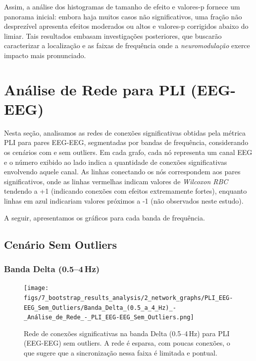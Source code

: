 Assim, a análise dos histogramas de tamanho de efeito e valores-p fornece um panorama inicial: embora haja muitos casos não significativos, uma fração não desprezível apresenta efeitos moderados ou altos e valores-p corrigidos abaixo do limiar. Tais resultados embasam investigações posteriores, que buscarão caracterizar a localização e as faixas de frequência onde a \emph{neuromodulação} exerce impacto mais pronunciado.


\section{Análise de Rede para PLI (EEG-EEG)}
\label{sec:rede_pli_eeg}

Nesta seção, analisamos as redes de conexões significativas obtidas pela métrica PLI para pares EEG-EEG, segmentadas por bandas de frequência, considerando os cenários com e sem outliers. Em cada grafo, cada nó representa um canal EEG e o número exibido ao lado indica a quantidade de conexões significativas envolvendo aquele canal. As linhas conectando os nós correspondem aos pares significativos, onde as linhas vermelhas indicam valores de \emph{Wilcoxon RBC} tendendo a +1 (indicando conexões com efeitos extremamente fortes), enquanto linhas em azul indicariam valores próximos a -1 (não observados neste estudo).

A seguir, apresentamos os gráficos para cada banda de frequência.

\subsection{Cenário Sem Outliers}
\subsubsection{\texorpdfstring{Banda Delta (0.5--4\,Hz)}{Banda Delta (0.5-4 Hz)}}
\begin{figure}[htb]
  \centering
  \texttt{[image: figs/7\_bootstrap\_results\_analysis/2\_network\_graphs/PLI\_EEG-EEG\_Sem\_Outliers/Banda\_Delta\_(0.5\_a\_4\_Hz)\_-\_Análise\_de\_Rede\_-\_PLI\_EEG-EEG\_Sem\_Outliers.png]}
  \caption{Rede de conexões significativas na banda Delta (0.5--4\,Hz) para PLI (EEG-EEG) sem outliers. A rede é esparsa, com poucas conexões, o que sugere que a sincronização nessa faixa é limitada e pontual.}
  \label{fig:rede_pli_delta_sem}
\end{figure}

